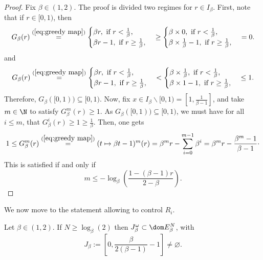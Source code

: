 \begin{proof} Fix $\beta \in (1,2)$. The proof is divided two regimes for $r \in I_\beta$. First, note that if $r \in [0,1)$, then
	\begin{equation}
		G_\beta(r) \overset{(\ref{eq:greedy map})}{=} \begin{cases}
		\beta r, \ \text{if} \ r < \frac{1}{\beta},\\
		\beta r - 1, \ \text{if} \ r \geq \frac{1}{\beta}, 
	\end{cases} \geq \begin{cases}
		\beta \times 0, \ \text{if} \ r < \frac{1}{\beta},\\
		\beta \times \frac{1}{\beta} -1, \ \text{if} \ r \geq \frac{1}{\beta}, 
	\end{cases} = 0.
	\end{equation}
	and
	\begin{equation}
		G_\beta(r) \overset{(\ref{eq:greedy map})}{=} \begin{cases}
		\beta r, \ \text{if} \ r < \frac{1}{\beta},\\
		\beta r - 1, \ \text{if} \ r \geq \frac{1}{\beta}, 
	\end{cases} < \begin{cases}
		\beta \times \frac{1}{\beta}, \ \text{if} \ r < \frac{1}{\beta},\\
		\beta \times 1 -1, \ \text{if} \ r \geq \frac{1}{\beta}, 
	\end{cases} \leq 1.
	\end{equation}
	Therefore, $G_\beta([0,1)) \subseteq [0,1)$. Now, fix $x \in I_\beta \backslash [0,1) = \left[1,\frac{1}{\beta-1}\right]$, and take $m \in \N$ to satisfy $G^m_\beta(r) \geq 1$. As $G_\beta([0,1)) \subseteq [0,1)$, we must have for all $i \leq m$, that $G^i_\beta(r) \geq 1 \geq \frac{1}{\beta}$. Then, one gets
	\begin{equation}\label{eq:value of m to satisfy non greedy condition}
		1 \leq G^m_\beta(r) \overset{(\ref{eq:greedy map})}{=} (t \mapsto \beta t - 1)^m(r) = \beta^m r - \sum_{i=0}^{m-1} \beta^i = \beta^m r - \frac{\beta^m-1}{\beta-1} \cdot
	\end{equation}
	This is satisfied if and only if
	\begin{equation}
		m \leq -\log_\beta\left(\frac{1-(\beta-1)r}{2 - \beta}\right).
	\end{equation}
\end{proof}
\noindent We now move to the statement allowing to control $R_i$.
\begin{lemma}\label{eq:J beta is in dom E beta N}
	Let $\beta \in (1,2)$. If $N \geq \log_\beta(2)$ then $J_\beta^\omega \subset \dom E_\beta^N$, with 
	\begin{equation}\label{eq:definition J beta}
		J_\beta := \left[0, \frac{\beta}{2(\beta - 1)} - 1 \right] \neq \varnothing.
	\end{equation}
\end{lemma}
